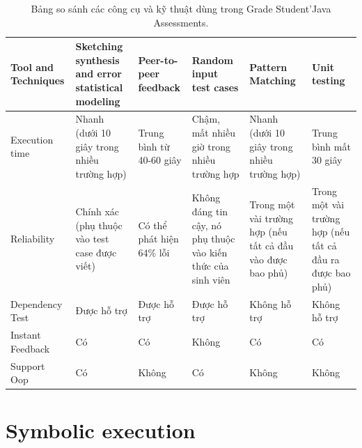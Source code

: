 \documentclass[12pt,a4paper]{article}
\begin{document}
\begin{table}[ht]
	\centering
\begin{tabular}{|m{2.5cm}||m{2.5cm}||m{2.5cm}||m{2.5cm}||m{2.5cm}||m{2.5cm}|}
\hline 
Tool and Techniques & Sketching synthesis and error statistical modeling & Peer-to-peer feedback & Random input test cases & Pattern Matching & Unit testing\\ 
\hline 
Execution time & Nhanh (dưới 10 giây trong nhiều trường hợp) & Trung bình từ 40-60 giây & Chậm, mất nhiều giờ trong nhiều trường hợp & Nhanh (dưới 10 giây trong nhiều trường hợp) & Trung bình mất 30 giây\\ 
\hline 
Reliability & Chính xác (phụ thuộc vào test case được viết) & Có thể phát hiện 64\% lỗi & Không đáng tin cậy, nó phụ thuộc vào kiến thức của sinh viên & Trong một vài trường hợp (nếu tất cả đầu vào được bao phủ) & Trong một vài trường hợp (nếu tất cả đầu ra được bao phủ)\\
\hline
Dependency Test & Được hỗ trợ & Được hỗ trợ & Được hỗ trợ & Không hỗ trợ & Không hỗ trợ\\
\hline
Instant Feedback & Có & Có & Không & Có & Có\\
\hline
Support Oop & Có & Không & Có & Không & Không\\
\hline
\end{tabular}
\caption{Bảng so sánh các công cụ và kỹ thuật dùng trong Grade Student’Java Assessments.}
\end{table}
\section{Symbolic execution}
\end{document}
